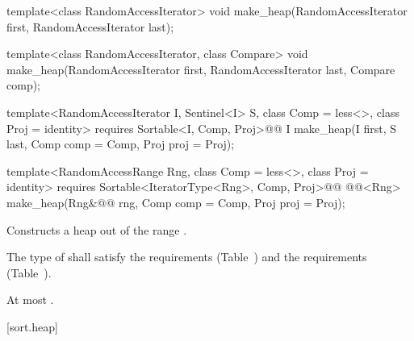 %
\begin{removedblock}
\begin{itemdecl}
template<class RandomAccessIterator>
  void make_heap(RandomAccessIterator first, RandomAccessIterator last);

template<class RandomAccessIterator, class Compare>
  void make_heap(RandomAccessIterator first, RandomAccessIterator last,
                 Compare comp);
\end{itemdecl}
\end{removedblock}
\begin{addedblock}
\begin{itemdecl}
template<RandomAccessIterator I, Sentinel<I> S, class Comp = less<>,
    class Proj = identity>
  requires Sortable<I, Comp, Proj>@\newtxt{()}@
  I make_heap(I first, S last, Comp comp = Comp{}, Proj proj = Proj{});

template<RandomAccessRange Rng, class Comp = less<>, class Proj = identity>
  requires Sortable<IteratorType<Rng>, Comp, Proj>@\newtxt{()}@
  @@<Rng>
    make_heap(Rng&@\newtxt{\&}@ rng, Comp comp = Comp{}, Proj proj = Proj{});
\end{itemdecl}
\end{addedblock}

\begin{itemdescr}
\pnum
\effects
Constructs a heap out of the range
.

\begin{removedblock}
\pnum
\requires The type of  shall satisfy
the  requirements
(Table~) and the
 requirements
(Table~).
\end{removedblock}

\begin{addedblock}
\pnum
\returns {}
\end{addedblock}

\pnum
\complexity
At most
.
\end{itemdescr}

[sort.heap]{}

